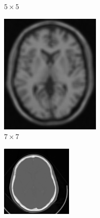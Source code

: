 \documentclass[letterpaper,12pt]{article}
\theoremstyle{plain}
\begin{document}
\begin{figure}[h]
\begin{subfigure}[h]{0.24\linewidth}
            \caption{$5\times5$} 
         \end{subfigure}
         \begin{subfigure}[h]{0.24\linewidth}
            \centering
            \includegraphics[width=\textwidth]{Figuras/ImagenA7x7.png}
            \caption{$7\times7$} 
         \end{subfigure}
         \begin{subfigure}[h]{0.24\linewidth}
            \centering
            \includegraphics[width=\textwidth]{Figuras/ImagenC.png}

\end{subfigure}
\end{figure}
\end{document}
